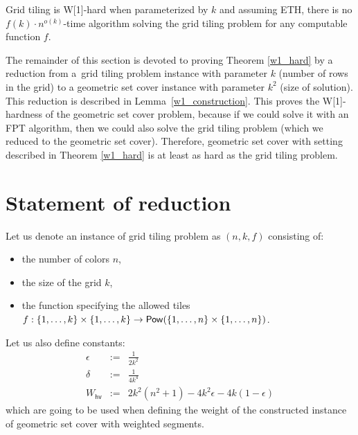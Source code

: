 

\begin{tw}
\label{grid_tiling_w1_hard}
\textbf{\cite{marx_grid_tiling}}
Grid tiling is W[1]-hard when parameterized by $k$ and
assuming ETH, there is no $f(k)\cdot n^{o(k)}$-time
algorithm solving the grid tiling problem
for any computable function $f$.
\end{tw}

The remainder of this section is devoted to proving Theorem \ref{w1_hard}
by a reduction from a~grid tiling problem instance
with parameter $k$ (number of rows in the grid)
to a geometric set cover instance with parameter $k^2$ (size of solution).
This reduction is described in Lemma~\ref{w1_construction}.
This proves the W[1]-hardness of the geometric set cover problem,
because if we could solve it with an FPT algorithm,
then we could also solve the grid tiling problem
(which we reduced to the geometric set cover).
Therefore, geometric set cover with setting
described in Theorem \ref{w1_hard}
is at least as hard as the grid tiling problem.

\newcommand{\hvWeight}{W_{\mathsf{hv}}}
\newcommand{\solWeight}{\hvWeight+k^2\delta }
\newcommand{\instanceSetCover}{(\points, \sets, w, 3k^2+2k)}
\newcommand{\instanceGridTiling}{(n,k,f)}
\newcommand{\yes}{\texttt{YES}}
\newcommand{\no}{\texttt{NO}}

\section{Statement of reduction}

Let us denote an instance of grid tiling problem as $\instanceGridTiling$ consisting of:
\begin{itemize}
\item the number of colors $n$,
\item the size of the grid $k$,
\item the function specifying the allowed tiles
$f : \{1, \ldots, k\} \times \{1, \ldots, k\} \rightarrow \mathsf{Pow}(\{1, \ldots, n\} \times \{1, \ldots, n\})$.
\end{itemize}

Let us also define constants: 
\begin{eqnarray*}
\epsilon & := & \frac{1}{2k^2} \\
\delta & := & \frac{1}{4k^4} \\
\hvWeight & := & 2k^2(n^2+1) -4k^2\epsilon -4k(1-\epsilon)
\end{eqnarray*}
which are going to be used when defining the weight of the constructed
instance of geometric set cover with weighted segments.


